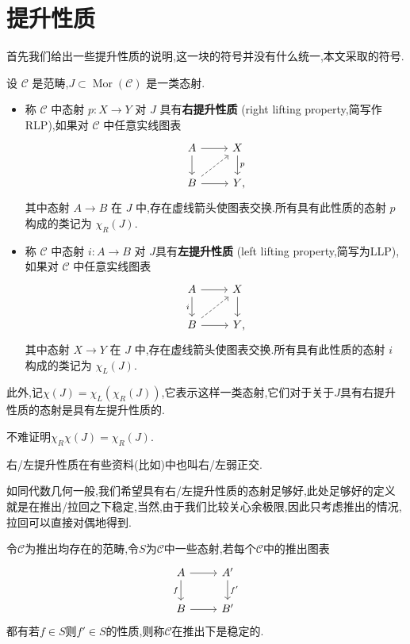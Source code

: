 \section{提升性质}\label{提升性质}
首先我们给出一些提升性质的说明,这一块的符号并没有什么统一,本文采取\cite{Land}的符号.
\begin{definition}
    设 $\mathcal{C}$ 是范畴,$J\subset\operatorname{Mor}(\mathcal{C})$ 是一类态射.
    \begin{itemize}
        \item
            称 $\mathcal{C}$ 中态射 $p : X \to Y$ 对 $J$ 具有\textbf{右提升性质} (right lifting property,简写作RLP),如果对 $\mathcal{C}$ 中任意实线图表
            \[
                \begin{tikzcd}
                    A \ar[r] \ar[d] & X \ar[d,"p"] \\
                    B \ar[r] \ar[ur, dashed] & Y \rlap{,}
                \end{tikzcd}
            \]
            其中态射 $A \to B$ 在 $J$ 中,存在虚线箭头使图表交换.所有具有此性质的态射 $p$ 构成的类记为 $\chi_R(J)$.
        \item
            称 $\mathcal{C}$ 中态射 $i : A \to B$ 对 $J$具有\textbf{左提升性质} (left lifting property,简写为LLP),如果对 $\mathcal{C}$ 中任意实线图表
            \[
                \begin{tikzcd}
                    A \ar[r] \ar[d,"i"'] & X \ar[d] \\
                    B \ar[r] \ar[ur, dashed] & Y \rlap{,}
                \end{tikzcd}
            \]
            其中态射 $X \to Y$ 在 $J$ 中,存在虚线箭头使图表交换.所有具有此性质的态射 $i$ 构成的类记为 $\chi_L(J)$.
    \end{itemize}
    此外,记$\chi(J)=\chi_L(\chi_R(J))$,它表示这样一类态射,它们对于关于$J$具有右提升性质的态射是具有左提升性质的.
\end{definition}
不难证明$\chi_R\chi(J) = \chi_R(J)$.
\begin{remark}
    右/左提升性质在有些资料(比如\cite{Kerodon})中也叫右/左弱正交.
\end{remark}
如同代数几何一般,我们希望具有右/左提升性质的态射足够好,此处足够好的定义就是在推出/拉回之下稳定,当然,由于我们比较关心余极限,因此只考虑推出的情况,拉回可以直接对偶地得到.
\begin{definition}
    令$\mathcal{C}$为推出均存在的范畴,令$S$为$\mathcal{C}$中一些态射,若每个$\mathcal{C}$中的推出图表
    \[\begin{tikzcd}
	A & {A'} \\
	B & {B'}
	\arrow[from=1-1, to=1-2]
	\arrow["f"', from=1-1, to=2-1]
	\arrow["{f'}", from=1-2, to=2-2]
	\arrow[from=2-1, to=2-2]
    \end{tikzcd}\]
    都有若$f\in S$则$f'\in S$的性质,则称$\mathcal{C}$在推出下是稳定的.
\end{definition}
